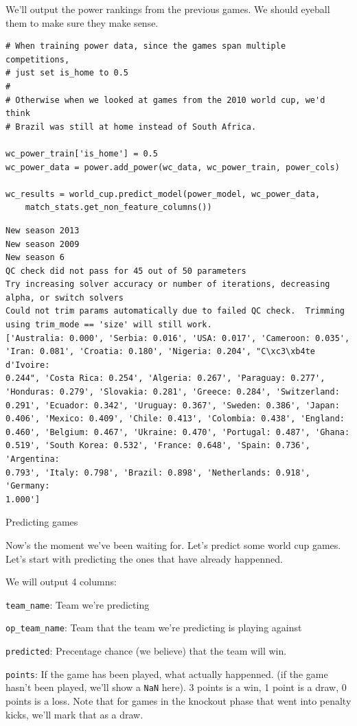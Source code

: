 \documentclass[12pt,fleqn]{article}\usepackage{common}
\begin{document}
We'll output the power rankings from the previous games. We should eyeball
them to make sure they make sense.

\begin{verbatim}
# When training power data, since the games span multiple competitions, 
# just set is_home to 0.5
#
# Otherwise when we looked at games from the 2010 world cup, we'd think 
# Brazil was still at home instead of South Africa.

wc_power_train['is_home'] = 0.5
wc_power_data = power.add_power(wc_data, wc_power_train, power_cols)

wc_results = world_cup.predict_model(power_model, wc_power_data, 
    match_stats.get_non_feature_columns())
\end{verbatim}

\begin{verbatim}
New season 2013
New season 2009
New season 6
QC check did not pass for 45 out of 50 parameters
Try increasing solver accuracy or number of iterations, decreasing alpha, or switch solvers
Could not trim params automatically due to failed QC check.  Trimming using trim_mode == 'size' will still work.
['Australia: 0.000', 'Serbia: 0.016', 'USA: 0.017', 'Cameroon: 0.035',
'Iran: 0.081', 'Croatia: 0.180', 'Nigeria: 0.204', "C\xc3\xb4te d'Ivoire:
0.244", 'Costa Rica: 0.254', 'Algeria: 0.267', 'Paraguay: 0.277',
'Honduras: 0.279', 'Slovakia: 0.281', 'Greece: 0.284', 'Switzerland:
0.291', 'Ecuador: 0.342', 'Uruguay: 0.367', 'Sweden: 0.386', 'Japan:
0.406', 'Mexico: 0.409', 'Chile: 0.413', 'Colombia: 0.438', 'England:
0.460', 'Belgium: 0.467', 'Ukraine: 0.470', 'Portugal: 0.487', 'Ghana:
0.519', 'South Korea: 0.532', 'France: 0.648', 'Spain: 0.736', 'Argentina:
0.793', 'Italy: 0.798', 'Brazil: 0.898', 'Netherlands: 0.918', 'Germany:
1.000'] 
\end{verbatim}


Predicting games

Now's the moment we've been waiting for. Let's predict some world cup games. Let's start with predicting the ones that have already happenned.

We will output 4 columns:

\verb!team_name!: Team we're predicting

\verb!op_team_name!: Team that the team we're predicting is playing against

\verb!predicted!: Precentage chance (we believe) that the team will win.

\verb!points!: If the game has been played, what actually happenned. (if
the game hasn't been played, we'll show a \verb!NaN! here). 3 points is a
win, 1 point is a draw, 0 points is a loss. Note that for games in the
knockout phase that went into penalty kicks, we'll mark that as a draw.
\end{document}
